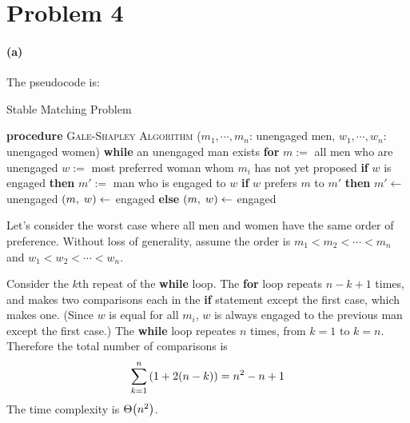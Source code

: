 \documentclass[10pt]{article}
\begin{document}
\section*{Problem 4}
\paragraph{(a)} The pseudocode is:
\begin{algorithm}[H]
    \caption{Stable Matching Problem}
    \begin{algorithmic}[1]
        \State \textbf{procedure} \textsc{\small Gale-Shapley Algorithm} ($m_1, \cdots , m_n$: unengaged men, $w_1,  \cdots , w_n$: unengaged women)
            \State \hspace{0.53cm}\textbf{while} an unengaged man exists
                \State \hspace{1.06cm}\textbf{for} $m :=$ all men who are unengaged
                    \State \hspace{1.59cm}$w := $ most preferred woman whom $m_i$ has not yet proposed
                    \State \hspace{1.59cm}\textbf{if} $w$ is engaged \textbf{then}
                        \State \hspace{2.12cm}$m' :=$ man who is engaged to $w$
                        \State \hspace{2.12cm}\textbf{if} $w$ prefers $m$ to $m'$ \textbf{then}
                            \State \hspace{2.65cm}$m' \leftarrow$ unengaged
                            \State \hspace{2.65cm}$\qty(m,\; w) \leftarrow$ engaged
                    \State \hspace{1.59cm}\textbf{else}
                        \State \hspace{2.12cm}$\qty(m, \; w) \leftarrow$ engaged
    \end{algorithmic}
\end{algorithm}
Let's consider the worst case where all men and women have the same order of preference. 
Without loss of generality, assume the order is  $m_1 < m_2 < \cdots < m_n$ and $w_1 < w_2 < \cdots < w_n$.

\vspace{0.3cm} Consider the $k$th repeat of the \textbf{while} loop. 
The \textbf{for} loop repeats $n-k+1$ times, and makes two comparisons each in the \textbf{if} statement except the first case, which makes one. 
(Since $w$ is equal for all $m_i$, $w$ is always engaged to the previous man except the first case.)
The \textbf{while} loop repeates $n$ times, from $k=1$ to $k=n$.
Therefore the total number of comparisons is
$$\sum_{k=1}^{n}\qty(1 + 2(n-k)) = n^2 - n + 1$$
The time complexity is $\Theta\qty(n^2)$.
\end{document}

